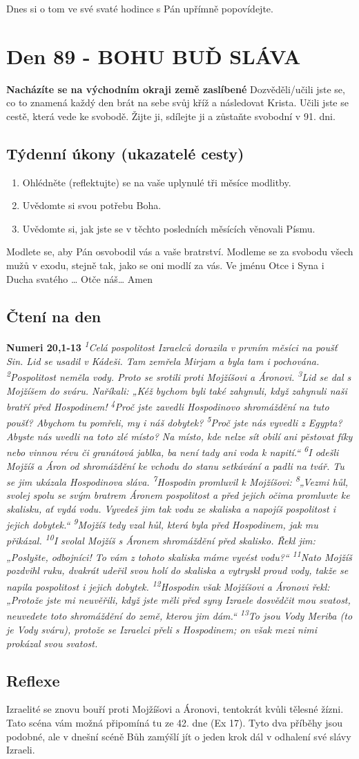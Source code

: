 \documentclass[11pt]{article}
\newcommand{\zacatekTrinactyTyden}{
\textbf{Nacházíte se na východním okraji země zaslíbené} \newline 
Dozvěděli/učili jste se, co to znamená každý den brát na sebe svůj kříž a následovat Krista. Učili jste se cestě, která vede ke svobodě. Žijte ji, sdílejte ji a zůstaňte svobodní v 91. dni.

\subsection*{Týdenní úkony (ukazatelé cesty)}
\begin{enumerate}
  \item Ohlédněte (reflektujte) se na vaše uplynulé tři měsíce modlitby.
  \item Uvědomte si svou potřebu Boha.
  \item Uvědomte si, jak jste se v těchto posledních měsících věnovali Písmu.
\end{enumerate}
Modlete se, aby Pán osvobodil vás a vaše bratrství. \newline
Modleme se za svobodu všech mužů v exodu, stejně tak, jako se oni modlí za vás.\newline
Ve jménu Otce i Syna i Ducha svatého …  Otče náš… Amen
}
\begin{document}
Dnes si o tom ve své svaté hodince s Pán upřímně popovídejte.


\newpage
\section{Den 89 - BOHU BUĎ SLÁVA}
\zacatekTrinactyTyden
\subsection*{Čtení na den}
\textbf{Numeri 20,1-13}
\newline
\textit{
\textsuperscript{1}Celá pospolitost Izraelců dorazila v prvním měsíci na poušť Sin. Lid se usadil v Kádeši. Tam zemřela Mirjam a byla tam i pochována.
\textsuperscript{2}Pospolitost neměla vody. Proto se srotili proti Mojžíšovi a Áronovi.
\textsuperscript{3}Lid se dal s Mojžíšem do sváru. Naříkali: „Kéž bychom byli také zahynuli, když zahynuli naši bratří před Hospodinem!
\textsuperscript{4}Proč jste zavedli Hospodinovo shromáždění na tuto poušť? Abychom tu pomřeli, my i náš dobytek?
\textsuperscript{5}Proč jste nás vyvedli z Egypta? Abyste nás uvedli na toto zlé místo? Na místo, kde nelze sít obilí ani pěstovat fíky nebo vinnou révu či granátová jablka, ba není tady ani voda k napití.“
\textsuperscript{6}I odešli Mojžíš a Áron od shromáždění ke vchodu do stanu setkávání a padli na tvář. Tu se jim ukázala Hospodinova sláva.
\textsuperscript{7}Hospodin promluvil k Mojžíšovi:
\textsuperscript{8}„Vezmi hůl, svolej spolu se svým bratrem Áronem pospolitost a před jejich očima promluvte ke skalisku, ať vydá vodu. Vyvedeš jim tak vodu ze skaliska a napojíš pospolitost i jejich dobytek.“
\textsuperscript{9}Mojžíš tedy vzal hůl, která byla před Hospodinem, jak mu přikázal.
\textsuperscript{10}I svolal Mojžíš s Áronem shromáždění před skalisko. Řekl jim: „Poslyšte, odbojníci! To vám z tohoto skaliska máme vyvést vodu?“
\textsuperscript{11}Nato Mojžíš pozdvihl ruku, dvakrát udeřil svou holí do skaliska a vytryskl proud vody, takže se napila pospolitost i jejich dobytek.
\textsuperscript{12}Hospodin však Mojžíšovi a Áronovi řekl: „Protože jste mi neuvěřili, když jste měli před syny Izraele dosvědčit mou svatost, neuvedete toto shromáždění do země, kterou jim dám.“
\textsuperscript{13}To jsou Vody Meriba (to je Vody sváru), protože se Izraelci přeli s Hospodinem; on však mezi nimi prokázal svou svatost.
}

\subsection*{Reflexe}
Izraelité se znovu bouří proti Mojžíšovi a Áronovi, tentokrát kvůli tělesné žízni. Tato scéna vám možná připomíná tu
ze 42. dne (Ex 17). Tyto dva příběhy jsou podobné, ale v dnešní scéně Bůh zamýšlí jít o jeden krok dál v odhalení své
slávy Izraeli.
\end{document}
